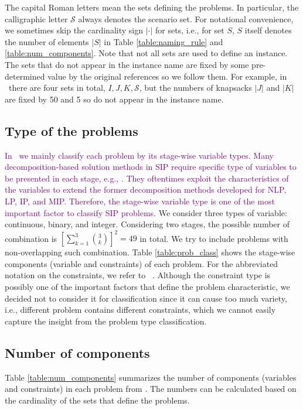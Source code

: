 The capital Roman letters mean the sets defining the problems. In particular, the calligraphic letter $\mathcal{S}$ always denotes the scenario set. For notational convenience, we sometimes skip the cardinality sign $|\cdot|$ for sets, i.e., for set $S$, $S$ itself denotes the number of elements $|S|$ in Table \ref{table:naming_rule} and \ref{table:num_components}. Note that not all sets are used to define an instance. The sets that do not appear in the instance name are fixed by some pre-determined value by the original references so we follow them. For example, in \smkp\ there are four sets in total, $I,J,K,\mathcal{S}$, but the numbers of knapsacks $|J|$ and $|K|$ are fixed by 50 and 5 so do not appear in the instance name.


\subsection{Type of the problems}
\textcolor{purple}{In \siplibtwo\, we mainly classify each problem by its stage-wise variable types. Many decomposition-based solution methods in SIP require specific type of variables to be presented in each stage, e.g., \cite{LL1993,SSV1998,CT1998,CS1999,SF2002}. They oftentimes exploit the characteristics of the variables to extend the former decomposition methods developed for NLP, LP, IP, and MIP. Therefore, the stage-wise variable type is one of the most important factor to classify SIP problems.}
We consider three types of variable: continuous, binary, and integer. Considering two stages, the possible number of combination is $\left[\sum_{k=1}^3\binom{3}{k}\right]^2=49$ in total. We try to include problems with non-overlapping such combination. Table \ref{table:prob_class} shows the stage-wise components (variable and constraints) of each problem. For the abbreviated notation on the constraints, we refer to \miplib\ \cite{MIPLIB}. Although the constraint type is possibly one of the important factors that define the problem characteristic, we decided not to consider it for classification since it can cause too much variety, i.e., different problem contains different constraints, which we cannot easily capture the insight from the problem type classification. 


\subsection{Number of components}
Table \ref{table:num_components} summarizes the number of components (variables and constraints) in each problem from \siplibtwo. The numbers can be calculated based on the cardinality of the sets that define the problems.


